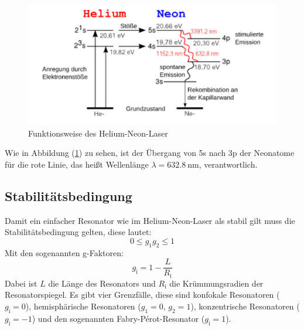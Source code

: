 \begin{figure}[h!]
  \centering
  \includegraphics[scale=0.7]{fig/heliumneon.png}
  \caption{Funktionsweise des Helium-Neon-Laser \cite{Anleitung5}}
  \label{fig:heliumneon}
\end{figure}
Wie in Abbildung (\ref{fig:heliumneon}) zu sehen, ist der Übergang von 5s nach 3p der Neonatome für die rote Linie, das heißt Wellenlänge $\lambda=\SI{632.8}{\nano\meter}$, verantwortlich.
\subsection{Stabilitätsbedingung}
Damit ein einfacher Resonator wie im Helium-Neon-Laser als stabil gilt muss die Stabilitätsbedingung gelten, diese lautet:
\begin{equation}
  \label{eqn:stabi}
  0\leq g_\mathrm{1}g_\mathrm{2}\leq1
\end{equation}
Mit den sogenannten g-Faktoren:
\begin{equation}
  \label{eqn:g-faktor}
  g_\mathrm{i}=1-\dfrac{L}{R_\mathrm{i}}
\end{equation}
Dabei ist $L$ die Länge des Resonators und $R_\mathrm{i}$ die Krümmungsradien der Resonatorspiegel. Es gibt vier Grenzfälle, diese sind konfokale Resonatoren ($g_\mathrm{i}=0$), hemisphärische Resonatoren ($g_\mathrm{1}=0$, $g_\mathrm{2}=1$), konzentrische Resonatoren ($g_\mathrm{i}=-1$) und den sogenannten Fabry-Pérot-Resonator ($g_\mathrm{i}=1$).
